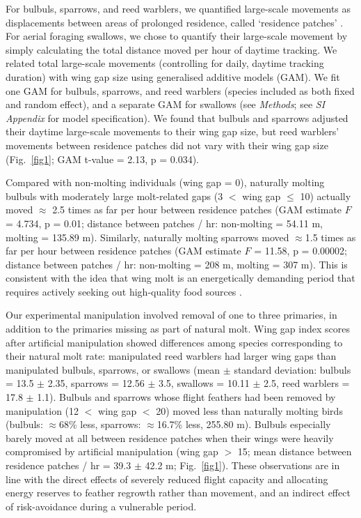 \begin{refsection}
For bulbuls, sparrows, and reed warblers, we quantified large-scale movements as displacements between areas of prolonged residence, called `residence patches' \cite{gupte2022d}.
For aerial foraging swallows, we chose to quantify their large-scale movement by simply calculating the total distance moved per hour of daytime tracking.
We related total large-scale movements (controlling for daily, daytime tracking duration) with wing gap size using generalised additive models (GAM).
We fit one GAM for bulbuls, sparrows, and reed warblers (species included as both fixed and random effect), and a separate GAM for swallows (see \textit{Methods}; see \textit{SI Appendix} for model specification).
We found that bulbuls and sparrows adjusted their daytime large-scale movements to their wing gap size, but reed warblers' movements between residence patches did not vary with their wing gap size (Fig.~\ref{fig1}; GAM t-value = 2.13, p = 0.034).

Compared with non-molting individuals (wing gap = 0), naturally molting bulbuls with moderately large molt-related gaps (3 $<$ wing gap $\leq$ 10) actually moved $\approx$ 2.5 times as far per hour between residence patches (GAM estimate $F$ = 4.734, p = 0.01; distance between patches / hr: non-molting = 54.11 m, molting = 135.89 m).
Similarly, naturally molting sparrows moved {$\approx$1.5 times} as far per hour between residence patches (GAM estimate $F$ = 11.58, p = 0.00002; distance between patches / hr: non-molting = 208 m, molting = 307 m).
This is consistent with the idea that wing molt is an energetically demanding period that requires actively seeking out high-quality food sources \citep{madsen1987a,fox1998}.

Our experimental manipulation involved removal of one to three primaries, in addition to the primaries missing as part of natural molt.
Wing gap index scores after artificial manipulation showed differences among species corresponding to their natural molt rate: manipulated reed warblers had larger wing gaps than manipulated bulbuls, sparrows, or swallows {(mean $\pm$ standard deviation: bulbuls = 13.5 $\pm$ 2.35, sparrows = 12.56 $\pm$ 3.5, swallows = 10.11 $\pm$ 2.5, reed warblers = 17.8 $\pm$ 1.1).}
Bulbuls and sparrows whose flight feathers had been removed by manipulation (12 $<$ wing gap $<$ 20) moved less than naturally molting birds {(bulbuls: $\approx$68\% less, sparrows: $\approx$16.7\% less, 255.80 m)}.
Bulbuls especially barely moved at all between residence patches when their wings were heavily compromised by artificial manipulation (wing gap $>$ 15; mean distance between residence patches / hr = 39.3 $\pm$ 42.2 m; Fig.~\ref{fig1}).
These observations are in line with the direct effects of severely reduced flight capacity and allocating energy reserves to feather regrowth rather than movement, and an indirect effect of risk-avoidance during a vulnerable period.


\end{refsection}
